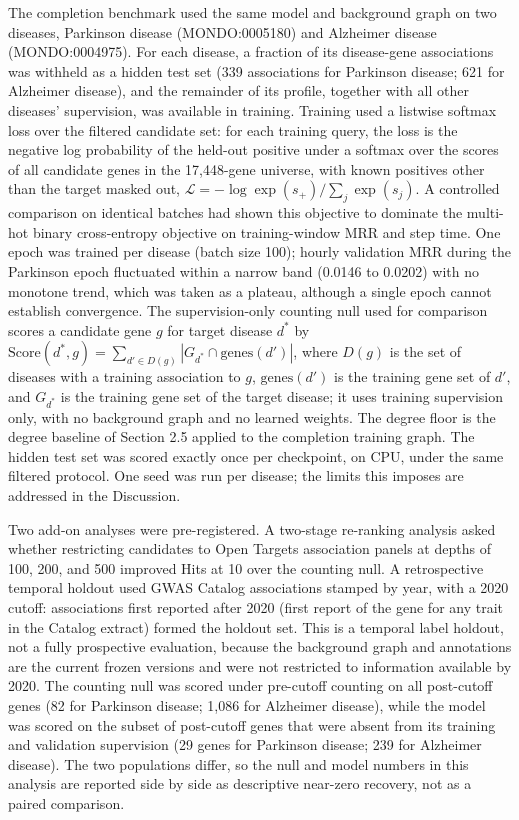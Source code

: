 \documentclass[11pt]{article}
\begin{document}
The completion benchmark used the same model and background graph on two diseases, Parkinson disease (MONDO:0005180) and Alzheimer disease (MONDO:0004975). For each disease, a fraction of its disease-gene associations was withheld as a hidden test set (339 associations for Parkinson disease; 621 for Alzheimer disease), and the remainder of its profile, together with all other diseases' supervision, was available in training. Training used a listwise softmax loss over the filtered candidate set: for each training query, the loss is the negative log probability of the held-out positive under a softmax over the scores of all candidate genes in the 17,448-gene universe, with known positives other than the target masked out, $\mathcal{L} = -\log \exp(s_{+}) / \sum_{j} \exp(s_{j})$. A controlled comparison on identical batches had shown this objective to dominate the multi-hot binary cross-entropy objective on training-window MRR and step time. One epoch was trained per disease (batch size 100); hourly validation MRR during the Parkinson epoch fluctuated within a narrow band (0.0146 to 0.0202) with no monotone trend, which was taken as a plateau, although a single epoch cannot establish convergence. The supervision-only counting null used for comparison scores a candidate gene $g$ for target disease $d^{*}$ by $\mathrm{Score}(d^{*}, g) = \sum_{d' \in D(g)} |G_{d^{*}} \cap \mathrm{genes}(d')|$, where $D(g)$ is the set of diseases with a training association to $g$, $\mathrm{genes}(d')$ is the training gene set of $d'$, and $G_{d^{*}}$ is the training gene set of the target disease; it uses training supervision only, with no background graph and no learned weights. The degree floor is the degree baseline of Section 2.5 applied to the completion training graph. The hidden test set was scored exactly once per checkpoint, on CPU, under the same filtered protocol. One seed was run per disease; the limits this imposes are addressed in the Discussion.

Two add-on analyses were pre-registered. A two-stage re-ranking analysis asked whether restricting candidates to Open Targets association panels at depths of 100, 200, and 500 improved Hits at 10 over the counting null. A retrospective temporal holdout used GWAS Catalog associations \cite{sollis2023} stamped by year, with a 2020 cutoff: associations first reported after 2020 (first report of the gene for any trait in the Catalog extract) formed the holdout set. This is a temporal label holdout, not a fully prospective evaluation, because the background graph and annotations are the current frozen versions and were not restricted to information available by 2020. The counting null was scored under pre-cutoff counting on all post-cutoff genes (82 for Parkinson disease; 1,086 for Alzheimer disease), while the model was scored on the subset of post-cutoff genes that were absent from its training and validation supervision (29 genes for Parkinson disease; 239 for Alzheimer disease). The two populations differ, so the null and model numbers in this analysis are reported side by side as descriptive near-zero recovery, not as a paired comparison.
\end{document}
